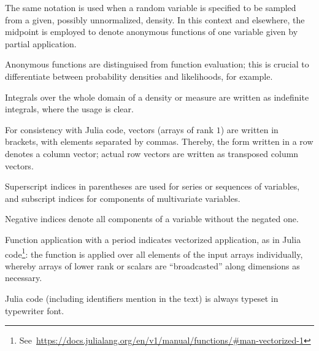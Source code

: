 \begin{symbolicfootnotes}
\begin{description}[style=nextline, leftmargin=4cm]
  \item[{\(Y \from q(\cdot, X_{i-1})\)}] The same notation is used when a random variable is specified
    to be sampled from a given, possibly unnormalized, density.  In this context and elsewhere, the
    midpoint is employed to denote anonymous functions of one variable given by partial application.
  \item[{\(y \mapsto \prob{x \given y, z}\)}] Anonymous functions are distinguised from function
    evaluation; this is crucial to differentiate between probability densities and likelihoods, for
    example.
  \item[\(\int \prob{x} \dif x = 1\)] Integrals over the whole domain of a density or measure are
    written as indefinite integrals, where the usage is clear.
  \item[{\([x, y, z] = \smash[b]{\begin{bsmallmatrix}x\\y\\z\end{bsmallmatrix}}\)}] For consistency
    with Julia code, vectors (arrays of rank \(1\)) are written in brackets, with elements separated
    by commas.  Thereby, the form written in a row denotes a column vector; actual row vectors are
    written as transposed column vectors.
  \item[{\(\kth{\Theta} = [\kth{\Theta}_1, \ldots, \kth{\Theta}_N]\)}] Superscript indices in
    parentheses are used for series or sequences of variables, and subscript indices for components of
    multivariate variables.
  \item[{\(z_{-i} = [z_{1}, \ldots, z_{i-1}, z_{i+1}, \ldots, z_{N}]\)}] Negative indices denote all
    components of a variable without the negated one.
  \item[{\(\broadcast{f}(x, 1) = [f(x_{1}, 1), \ldots, f(x_{N}, 1)]\)}] Function application with a
    period indicates vectorized application, as in Julia
    code\footnote{See~\protect\url{https://docs.julialang.org/en/v1/manual/functions/\#man-vectorized-1}}:
    the function is applied over all elements of the input arrays individually, whereby arrays of
    lower rank or scalars are \enquote{broadcasted} along dimensions as necessary.
  \item[{\jlinlfont f(x) = rand(x)}] Julia code (including identifiers mention in the text) is
    always typeset in typewriter font.
  \end{description}
\end{symbolicfootnotes}

